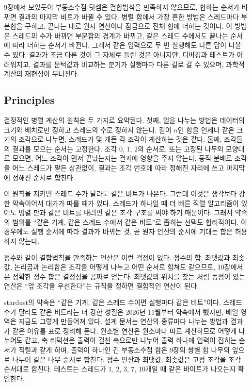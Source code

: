 9장에서 보았듯이 부동소수점 덧셈은 결합법칙을 만족하지 않으므로, 합하는 순서가 바뀌면 결과의 마지막 비트가 바뀔 수 있다. 병렬 합에서 가장 흔한 방법은 스레드마다 부분합을 구하고, 끝나는 대로 원자 연산이나 잠금으로 전체 합에 더하는 것이다. 이 방법은 스레드의 수가 바뀌면 부분합의 경계가 바뀌고, 같은 스레드 수에서도 끝나는 순서에 따라 더하는 순서가 바뀐다. 그래서 같은 입력으로 두 번 실행해도 다른 답이 나올 수 있다. 결과가 조금 다른 것이 그 자체로 틀린 것은 아니지만, 디버깅과 테스트가 어려워지고, 결과를 문턱값과 비교하는 분기가 실행마다 다른 길로 갈 수 있으며, 과학적 계산의 재현성이 무너진다\cite{demmel2013reproducible}.

\subsection{Principles}

결정적인 병렬 계산의 원칙은 두 가지로 요약된다. 첫째, 일을 나누는 방법은 데이터의 크기와 배치로만 정하고 스레드의 수로 정하지 않는다. 길이 $n$인 합을 언제나 같은 크기의 조각으로 나누면, 스레드가 몇 개든 각 조각이 계산하는 것은 같다. 둘째, 조각들의 결과를 모으는 순서는 고정한다. 조각 $0$, $1$, $2$의 순서로, 또는 고정된 나무의 모양대로 모으면, 어느 조각이 먼저 끝났는지는 결과에 영향을 주지 않는다. 동적 분배로 조각을 어느 스레드가 맡든 상관없이, 결과는 조각 번호에 따라 정해진 자리에 쓰고 마지막에 정해진 순서로 합친다.

이 원칙을 지키면 스레드 수가 달라도 같은 비트가 나온다. 그런데 이것은 생각보다 강한 약속이어서 대가가 따를 때가 있다. 스레드가 하나일 때 더 빠른 직렬 알고리즘이 있어도 병렬 판과 같은 비트를 내려면 같은 조각 구조를 써야 하기 때문이다. 그래서 약속의 범위를 ``같은 기계, 같은 스레드 수에서 같은 비트''로 좁히는 선택도 합리적이다. 이 경우에도 실행 순서에 따라 결과가 바뀌는 것, 곧 원자 연산의 순서에 기대는 합은 허용하지 않는다.

정수와 같이 결합법칙을 만족하는 연산은 이런 걱정이 없다. 정수의 합, 최댓값과 최솟값, 논리곱과 논리합은 조각을 어떻게 나누고 어떤 순서로 합쳐도 같으므로, 10장에서 본 정확한 정수 합은 결정성을 공짜로 얻는다. 최댓값의 위치를 찾는 처럼 동점이 있는 연산은 ``앞 조각을 우선한다''는 규칙을 정하면 결합적인 연산이 된다.

\begin{instardust}
stardust의 약속은 ``같은 기계, 같은 스레드 수이면 실행마다 같은 비트''이다. 스레드 수가 달라도 같은 비트라는 더 강한 성질은 2026년 11월부터 약속에서 뺐지만, 배열 영역은 지금도 그렇게 만들어져 있다. 설계 문서는 연산의 종류마다 나누는 방법과 결과가 같은 이유를 표로 정리해 둔다. 원소별 연산은 원소마다 따로 계산하므로 어떻게 나누어도 같고, 축 리덕션은 출력이 걸친 축으로만 나누어 출력 하나에 입력이 접히는 순서가 직렬과 같게 하며, 출력이 하나인 긴 부동소수점 합은 9장의 쌍별 합 나무의 잎으로 나누어 같은 나무 순서로 합친다. 정수 연산과 최댓값, 최솟값은 고정 조각을 조각 순서대로 합친다. 테스트는 스레드가 $1$, $2$, $3$, $7$, $10$개일 때 같은 바이트가 나오는지 확인한다.
\end{instardust}


